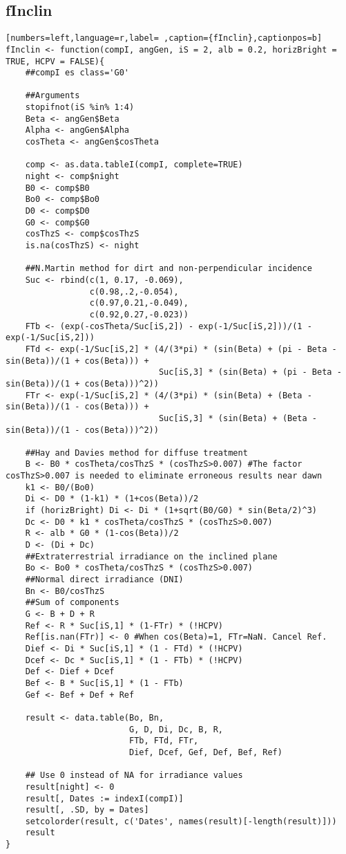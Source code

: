 \subsection{fInclin}
\label{sec:orgd5c03c1}
\label{subsec:finclin}
\begin{lstlisting}[numbers=left,language=r,label= ,caption={fInclin},captionpos=b]
fInclin <- function(compI, angGen, iS = 2, alb = 0.2, horizBright = TRUE, HCPV = FALSE){
    ##compI es class='G0'

    ##Arguments
    stopifnot(iS %in% 1:4)
    Beta <- angGen$Beta
    Alpha <- angGen$Alpha
    cosTheta <- angGen$cosTheta

    comp <- as.data.tableI(compI, complete=TRUE)
    night <- comp$night
    B0 <- comp$B0
    Bo0 <- comp$Bo0
    D0 <- comp$D0
    G0 <- comp$G0
    cosThzS <- comp$cosThzS
    is.na(cosThzS) <- night

    ##N.Martin method for dirt and non-perpendicular incidence
    Suc <- rbind(c(1, 0.17, -0.069),
                 c(0.98,.2,-0.054),
                 c(0.97,0.21,-0.049),
                 c(0.92,0.27,-0.023))
    FTb <- (exp(-cosTheta/Suc[iS,2]) - exp(-1/Suc[iS,2]))/(1 - exp(-1/Suc[iS,2]))
    FTd <- exp(-1/Suc[iS,2] * (4/(3*pi) * (sin(Beta) + (pi - Beta - sin(Beta))/(1 + cos(Beta))) +
                               Suc[iS,3] * (sin(Beta) + (pi - Beta - sin(Beta))/(1 + cos(Beta)))^2))
    FTr <- exp(-1/Suc[iS,2] * (4/(3*pi) * (sin(Beta) + (Beta - sin(Beta))/(1 - cos(Beta))) +
                               Suc[iS,3] * (sin(Beta) + (Beta - sin(Beta))/(1 - cos(Beta)))^2))

    ##Hay and Davies method for diffuse treatment
    B <- B0 * cosTheta/cosThzS * (cosThzS>0.007) #The factor cosThzS>0.007 is needed to eliminate erroneous results near dawn
    k1 <- B0/(Bo0)
    Di <- D0 * (1-k1) * (1+cos(Beta))/2
    if (horizBright) Di <- Di * (1+sqrt(B0/G0) * sin(Beta/2)^3)
    Dc <- D0 * k1 * cosTheta/cosThzS * (cosThzS>0.007)
    R <- alb * G0 * (1-cos(Beta))/2
    D <- (Di + Dc)
    ##Extraterrestrial irradiance on the inclined plane
    Bo <- Bo0 * cosTheta/cosThzS * (cosThzS>0.007) 
    ##Normal direct irradiance (DNI)
    Bn <- B0/cosThzS
    ##Sum of components
    G <- B + D + R
    Ref <- R * Suc[iS,1] * (1-FTr) * (!HCPV)
    Ref[is.nan(FTr)] <- 0 #When cos(Beta)=1, FTr=NaN. Cancel Ref.
    Dief <- Di * Suc[iS,1] * (1 - FTd) * (!HCPV)
    Dcef <- Dc * Suc[iS,1] * (1 - FTb) * (!HCPV)
    Def <- Dief + Dcef
    Bef <- B * Suc[iS,1] * (1 - FTb)
    Gef <- Bef + Def + Ref

    result <- data.table(Bo, Bn,
                         G, D, Di, Dc, B, R,
                         FTb, FTd, FTr,
                         Dief, Dcef, Gef, Def, Bef, Ref) 

    ## Use 0 instead of NA for irradiance values
    result[night] <- 0
    result[, Dates := indexI(compI)]
    result[, .SD, by = Dates]
    setcolorder(result, c('Dates', names(result)[-length(result)]))
    result
}
\end{lstlisting}
